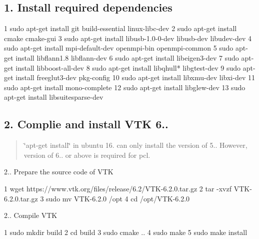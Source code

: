 \subsection*{1. Install required dependencies}


\begin{DoxyCode}
1 sudo apt-get install git build-essential linux-libc-dev
2 sudo apt-get install cmake cmake-gui
3 sudo apt-get install libusb-1.0-0-dev libusb-dev libudev-dev
4 sudo apt-get install mpi-default-dev openmpi-bin openmpi-common
5 sudo apt-get install libflann1.8 libflann-dev
6 sudo apt-get install libeigen3-dev
7 sudo apt-get install libboost-all-dev
8 sudo apt-get install libqhull* libgtest-dev
9 sudo apt-get install freeglut3-dev pkg-config
10 sudo apt-get install libxmu-dev libxi-dev
11 sudo apt-get install mono-complete
12 sudo apt-get install libglew-dev
13 sudo apt-get install libsuitesparse-dev
\end{DoxyCode}


\subsection*{2. Complie and install V\+TK 6..}

\begin{quote}
\char`\"{}apt-\/get install\char`\"{} in ubuntu 16. can only install the version of 5.. However, version of 6.. or above is required for pcl. \end{quote}

\begin{DoxyItemize}
\item 2.. Prepare the source code of V\+TK
\end{DoxyItemize}


\begin{DoxyCode}
1 wget https://www.vtk.org/files/release/6.2/VTK-6.2.0.tar.gz
2 tar -xvzf VTK-6.2.0.tar.gz
3 sudo mv VTK-6.2.0 /opt
4 cd /opt/VTK-6.2.0
\end{DoxyCode}



\begin{DoxyItemize}
\item 2.. Compile V\+TK 
\begin{DoxyCode}
1 sudo mkdir build
2 cd build
3 sudo cmake ..
4 sudo make
5 sudo make install
\end{DoxyCode}

\end{DoxyItemize}

